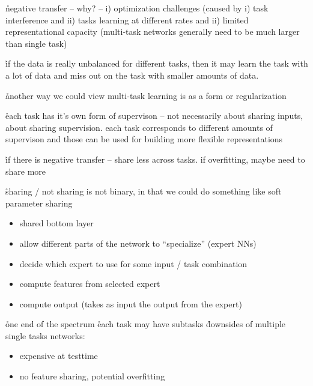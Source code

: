 \r{negative transfer -- why? -- i) optimization challenges (caused by i) task interference and ii) tasks learning at different rates and ii) limited representational capacity (multi-task networks generally need to be much larger than single task)}

\r{if the data is really unbalanced for different tasks, then it may learn the task with a lot of data and miss out on the task with smaller amounts of data.}


\r{another way we could view multi-task learning is as a form or regularization}

\r{each task has it's own form of supervison -- not necessarily about sharing inputs, about sharing supervision. each task corresponds to different amounts of supervison and those can be used for building more flexible representations}

\r{if there is negative transfer -- share less across tasks. if overfitting, maybe need to share more}

\r{sharing / not sharing is not binary, in that we could do something like soft parameter sharing}





\begin{itemize}[noitemsep,topsep=0pt]
	\item shared bottom layer
	\item allow different parts of the network to ``specialize'' (expert NNs)
	\item decide which expert to use for some input / task combination
	\item compute features from selected expert
	\item compute output (takes as input the output from the expert)
\end{itemize}



\r{one end of the spectrum}
\r{each task may have subtasks}
\r{downsides of multiple single tasks networks:}
\begin{itemize}[noitemsep,topsep=0pt]
	\item expensive at testtime
	\item no feature sharing, potential overfitting
\end{itemize}


